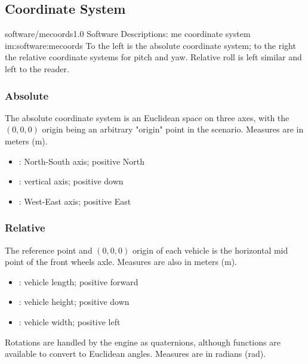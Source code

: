 \subsection{Coordinate System} %

\begin{image}
	{software/mecoords}{1.0}
	{Software Descriptions: \gls{me} coordinate system}
	{im:software:mecoords}
	{}
	{To the left is the absolute coordinate system; to the right the relative coordinate systems for pitch and yaw. Relative roll is left similar and left to the reader.}
\end{image}

\subsubsection{Absolute}

The absolute coordinate system is an Euclidean space on three axes, with the $(0,0,0)$ origin being an arbitrary "origin" point in the scenario. Measures are in meters (\si{\meter}).

\begin{itemize}
	\item {}: North-South axis; positive North
	\item {}: vertical axis; positive down
	\item {}: West-East axis; positive East
\end{itemize}

\subsubsection{Relative}

The reference point and $(0,0,0)$ origin of each vehicle is the horizontal mid point of the front wheels axle. Measures are also in meters (\si{\meter}).

\begin{itemize}
	\item {}: vehicle length; positive forward
	\item {}: vehicle height; positive down
	\item {}: vehicle width; positive left
\end{itemize}

\FLOATnoindent Rotations are handled by the engine as quaternions, although functions are available to convert to Euclidean angles. Measures are in radians (\si{\radian}).

